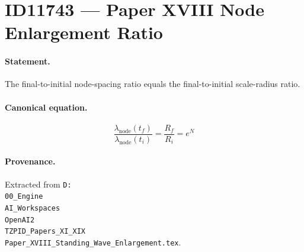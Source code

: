 \section*{ID11743 --- Paper XVIII Node Enlargement Ratio}

\paragraph{Statement.}
The final-to-initial node-spacing ratio equals the final-to-initial scale-radius ratio.

\paragraph{Canonical equation.}
\[
\frac{\lambda_{\mathrm{node}}(t_f)}{\lambda_{\mathrm{node}}(t_i)}=\frac{R_f}{R_i}=e^N
\]

\paragraph{Provenance.}
Extracted from \texttt{D:\\00\_Engine\\AI\_Workspaces\\OpenAI2\\TZPID\_Papers\_XI\_XIX\\Paper\_XVIII\_Standing\_Wave\_Enlargement.tex}.
